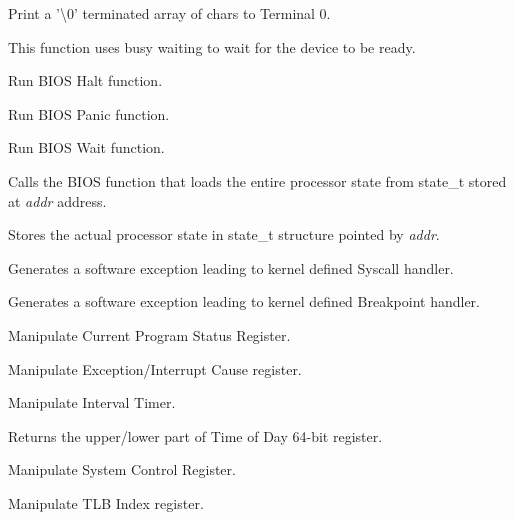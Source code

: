 
Print a '\textbackslash0' terminated array of chars to Terminal 0.

This function uses busy waiting to wait for the device to be ready.


Run BIOS Halt function.


Run BIOS Panic function.


Run BIOS Wait function.


Calls the BIOS function that loads the entire processor state from state\_t stored at \emph{addr} address.


Stores the actual processor state in state\_t structure pointed by \emph{addr}.


Generates a software exception leading to kernel defined Syscall handler.


Generates a software exception leading to kernel defined Breakpoint handler.


Manipulate Current Program Status Register.


Manipulate Exception/Interrupt Cause register.


Manipulate Interval Timer.


Returns the upper/lower part of Time of Day 64-bit register.


Manipulate System Control Register.


Manipulate TLB Index register.

